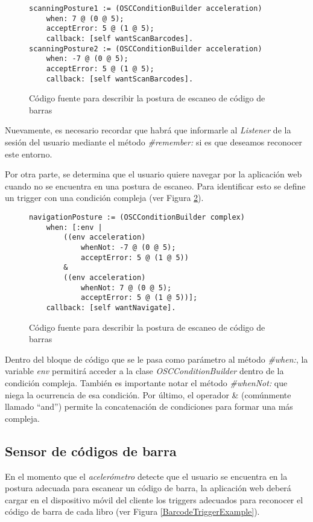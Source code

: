 \begin{figure}[ht!]
\begin{Verbatim}
scanningPosture1 := (OSCConditionBuilder acceleration)
	when: 7 @ (0 @ 5);
	acceptError: 5 @ (1 @ 5);
	callback: [self wantScanBarcodes].
scanningPosture2 := (OSCConditionBuilder acceleration)
	when: -7 @ (0 @ 5);
	acceptError: 5 @ (1 @ 5);
	callback: [self wantScanBarcodes].
\end{Verbatim}
\caption{Código fuente para describir la postura de escaneo de código de barras}
\label{ScanBarcodePostureExample}
\end{figure}

Nuevamente, es necesario recordar que habrá que informarle al \emph{Listener} de la sesión del usuario mediante el método \emph{\#remember:} si es que deseamos reconocer este entorno.

Por otra parte, se determina que el usuario quiere navegar por la aplicación web cuando no se encuentra en una postura de escaneo. Para identificar esto se define un trigger con una condición compleja (ver Figura \ref{NavigationPostureExample}).

\begin{figure}[ht!]
\begin{Verbatim}
navigationPosture := (OSCConditionBuilder complex)
	when: [:env |
		((env acceleration)
			whenNot: -7 @ (0 @ 5);
			acceptError: 5 @ (1 @ 5))
		&
		((env acceleration)
			whenNot: 7 @ (0 @ 5);
			acceptError: 5 @ (1 @ 5))];
	callback: [self wantNavigate].
\end{Verbatim}
\caption{Código fuente para describir la postura de escaneo de código de barras}
\label{NavigationPostureExample}
\end{figure}

Dentro del bloque de código que se le pasa como parámetro al método \emph{\#when:}, la variable \emph{env} permitirá acceder a la clase \emph{OSCConditionBuilder} dentro de la condición compleja. También es importante notar el método \emph{\#whenNot:} que niega la ocurrencia de esa condición. Por último, el operador \& (comúnmente llamado ``and'') permite la concatenación de condiciones para formar una más compleja.


\subsection{Sensor de códigos de barra}

En el momento que el \emph{acelerómetro} detecte que el usuario se encuentra en la postura adecuada para escanear un código de barra, la aplicación web deberá cargar en el dispositivo móvil del cliente los triggers adecuados para reconocer el código de barra de cada libro (ver Figura \ref{BarcodeTriggerExample}).

